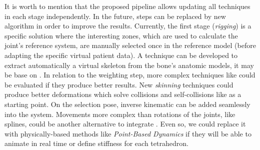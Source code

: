
It is worth to mention that the proposed pipeline allows updating all techniques in each stage independently. In the future, steps can be replaced by new algorithm in order to improve the results.
Currently, the first stage (\emph{rigging}) is a specific solution where the interesting zones, which are used to calculate the joint's reference system, are manually selected once in the reference model (before adapting the specific virtual patient data). A technique can be developed to extract automatically a virtual skeleton from the bone's anatomic models, it may be base on \cite{Tagliasacchi}.
In relation to the weighting step, more complex techniques like \cite{Jacobson:2011} could be evaluated if they produce better results.
New \emph{skinning} techniques could produce better deformations which solve collisions and self-collisions like \cite{Vaillant:2014} as a starting point.
On the selection pose, inverse kinematic \cite{Shi:2007} can be added seamlessly into the system. Movements more complex than rotations of the joints, like splines, could be another alternative to integrate \cite{joints}.
Even so, we could replace it with physically-based methods like \emph{Point-Based Dynamics} \cite{abu2015position} if they will be able to animate in real time or define stiffness for each tetrahedron.

